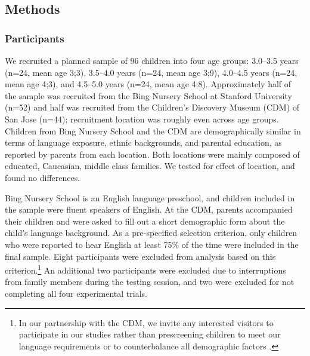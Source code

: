 \documentclass[man]{apa2}
\begin{document}

\subsection{Methods}

\subsubsection{Participants}

We recruited a planned sample of 96 children into four age groups: 3.0--3.5 years (n=24, mean age 3;3), 3.5--4.0 years (n=24, mean age 3;9), 4.0--4.5 years (n=24, mean age 4;3), and 4.5--5.0 years (n=24, mean age 4;8).  Approximately half of the sample was recruited from the Bing Nursery School at Stanford University (n=52) and half was recruited from the Children's Discovery Museum (CDM) of San Jose (n=44); recruitment location was roughly even across age groups. Children from Bing Nursery School and the CDM are demographically similar in terms of language exposure, ethnic backgrounds, and parental education, as reported by parents from each location.  Both locations were mainly composed of educated, Caucasian, middle class families.  We tested for effect of location, and found no differences.

Bing Nursery School is an English language preschool, and children included in the sample were fluent speakers of English. At the CDM, parents accompanied their children and were asked to fill out a short demographic form about the child's language background. As a pre-specified selection criterion, only children who were reported to hear English at least 75\% of the time were included in the final sample.  Eight participants were excluded from analysis based on this criterion.\footnote{In our partnership with the CDM, we invite any interested visitors to participate in our studies rather than prescreening children to meet our language requirements or to counterbalance all demographic factors \cite{callanan2012}. }  An additional two participants were excluded due to interruptions from family members during the testing session, and two were excluded for not completing all four experimental trials. 
\end{document}

